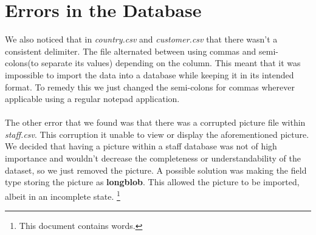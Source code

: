\documentclass{article}
\begin{document}
\section{Errors in the Database}
	We also noticed that in \emph{country.csv} and \emph{customer.csv} that there wasn’t a consistent delimiter. The file alternated between using commas 
	and semi-colons(to separate its values) depending 
	on the column. This meant that it was impossible to import the data into a database while keeping it in its intended format. 
	To remedy this we just changed the semi-colons for commas wherever applicable using a regular notepad application.
	\\\\
	The other error that we found was that there was a corrupted picture file within \emph{staff.csv}. This corruption it unable to view or display the aforementioned picture. 
	We decided that having a picture within a staff database was not of high importance and wouldn’t decrease the completeness or understandability of the dataset,
	so we just removed the picture. A possible solution was making the field type storing the picture as \textbf{longblob}. 
	This allowed the picture to be imported, albeit in an incomplete state. \footnote{This document contains \bashStdout words.}
\end{document}
